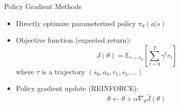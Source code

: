 \documentclass[10pt]{beamer}
\newcommand{\E}{\mathbb{E}}
\begin{document}
\begin{frame}{Policy Gradient Methods}

    \begin{itemize}
        \item Directly optimize parameterized policy $\pi_\theta(a|s)$
        \item Objective function (expected return):
        \begin{equation}
            J(\theta) = \E_{\tau \sim \pi_\theta} \left[ \sum_{t=0}^{T} \gamma^t r_t \right]
        \end{equation}
        where $\tau$ is a trajectory $(s_0, a_0, r_1, s_1, \ldots)$
        
        \item Policy gradient update (REINFORCE):
        \begin{equation}
            \theta \leftarrow \theta + \alpha \nabla_\theta \hat{J}(\theta)
        \end{equation}
        
    \end{itemize}
\end{frame}

\end{document}
